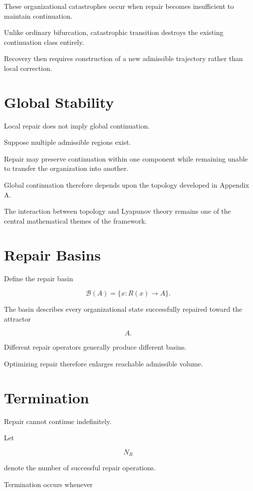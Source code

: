 \documentclass[11pt,oneside]{book}
\numberwithin{equation}{chapter}
\theoremstyle{definition}
\theoremstyle{plain}
\begin{document}
These organizational catastrophes occur when repair becomes insufficient
to maintain continuation.

Unlike ordinary bifurcation, catastrophic transition destroys the existing
continuation class entirely.

Recovery then requires construction of a new admissible trajectory rather
than local correction.

\section{Global Stability}

Local repair does not imply global continuation.

Suppose multiple admissible regions exist.

Repair may preserve continuation within one component while remaining
unable to transfer the organization into another.

Global continuation therefore depends upon the topology developed in
Appendix A.

The interaction between topology and Lyapunov theory remains one of the
central mathematical themes of the framework.

\section{Repair Basins}

Define the repair basin

\[
\mathcal B(A)
=
\{
x
:
R(x)
\rightarrow
A
\}.
\]

The basin describes every organizational state successfully repaired
toward the attractor

\[
A.
\]

Different repair operators generally produce different basins.

Optimizing repair therefore enlarges reachable admissible volume.

\section{Termination}

Repair cannot continue indefinitely.

Let

\[
N_R
\]

denote the number of successful repair operations.

Termination occurs whenever
\end{document}
